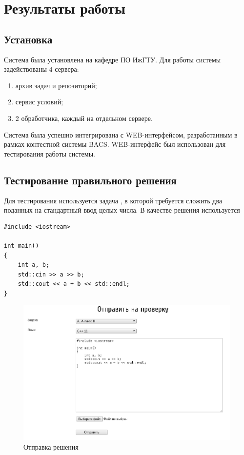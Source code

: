 \chapter{Результаты работы}
\label{results}

\section{Установка}
Система была установлена на кафедре ПО ИжГТУ.
Для работы системы задействованы 4 сервера:
\begin{enumerate}
    \item архив задач и репозиторий;
    \item сервис условий;
    \item 2 обработчика, каждый на отдельном сервере.
\end{enumerate}

Система была успешно интегрирована с WEB-интерфейсом,
разработанным в рамках контестной системы BACS.
WEB-интерфейс был использован для тестирования работы системы.

\section{Тестирование правильного решения}
Для тестирования используется задача ,
в которой требуется сложить два поданных на стандартный ввод
целых числа.
В качестве решения используется
\begin{lstlisting}
#include <iostream>

int main()
{
    int a, b;
    std::cin >> a >> b;
    std::cout << a + b << std::endl;
}
\end{lstlisting}

\begin{figure}[H]
    \centering
    \includegraphics[width=0.8\columnwidth]{rs/sendsubmitok}
    \caption{Отправка решения}
\end{figure}

